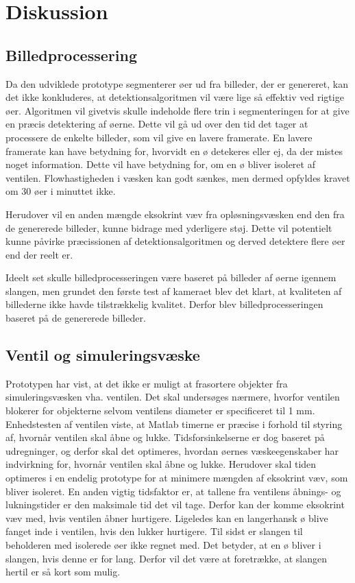 \chapter{Diskussion}

\section{Billedprocessering}
Da den udviklede prototype segmenterer øer ud fra billeder, der er genereret, kan det ikke konkluderes, at detektionsalgoritmen vil være lige så effektiv ved rigtige øer. Algoritmen vil givetvis skulle indeholde flere trin i segmenteringen for at give en præcis detektering af øerne. Dette vil gå ud over den tid det tager at processere de enkelte billeder, som vil give en lavere framerate. En lavere framerate kan have betydning for, hvorvidt en ø detekeres eller ej, da der mistes noget information. Dette vil have betydning for, om en ø bliver isoleret af ventilen. Flowhastigheden i væsken kan godt sænkes, men dermed opfyldes kravet om 30 øer i minuttet ikke.

Herudover vil en anden mængde eksokrint væv fra opløsningsvæsken end den fra de genererede billeder, kunne bidrage med yderligere støj. Dette vil potentielt kunne påvirke præcissionen af detektionsalgoritmen og derved detektere flere øer end der reelt er. 

Ideelt set skulle billedprocesseringen være baseret på billeder af øerne igennem slangen, men grundet den første test af kameraet blev det klart, at kvaliteten af billederne ikke havde tilstrækkelig kvalitet. Derfor blev billedprocesseringen baseret på de genererede billeder. 

\section{Ventil og simuleringsvæske}
Prototypen har vist, at det ikke er muligt at frasortere objekter fra simuleringsvæsken vha. ventilen. Det skal undersøges nærmere, hvorfor ventilen blokerer for objekterne selvom ventilens diameter er specificeret til 1 mm. Enhedstesten af ventilen viste, at Matlab timerne er præcise i forhold til styring af, hvornår ventilen skal åbne og lukke. Tidsforsinkelserne er dog baseret på udregninger, og derfor skal det optimeres, hvordan øernes væskeegenskaber har indvirkning for, hvornår ventilen skal åbne og lukke. Herudover skal tiden optimeres i en endelig prototype for at minimere mængden af eksokrint væv, som bliver isoleret. En anden vigtig tidsfaktor er, at tallene fra ventilens åbnings- og lukningstider er den maksimale tid det vil tage. Derfor kan der komme eksokrint væv med, hvis ventilen åbner hurtigere. Ligeledes kan en langerhansk ø blive fanget inde i ventilen, hvis den lukker hurtigere. Til sidst er slangen til beholderen med isolerede øer ikke regnet med. Det betyder, at en ø bliver i slangen, hvis denne er for lang. Derfor vil det være at foretrække, at slangen hertil er så kort som mulig.



